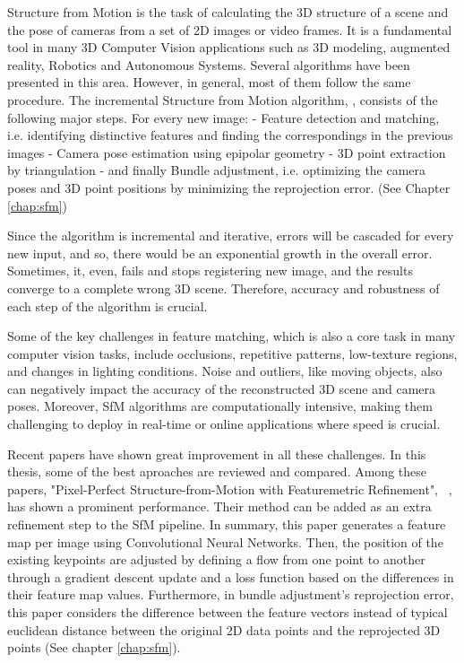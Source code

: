 \documentclass[11pt]{article}
\begin{document}
    Structure from Motion is the task of calculating the 3D structure of a scene and the pose of cameras from
    a set of 2D images or video frames.
    It is a fundamental tool in many 3D Computer Vision applications such as 3D modeling, augmented reality,
    Robotics and Autonomous Systems.
    Several algorithms have been presented in this area. However, in general, most of them follow the same procedure.
    The incremental Structure from Motion algorithm, \cite{schoenberger2016sfm}, consists of the following major steps.
    For every new image: - Feature detection and matching, i.e. identifying distinctive features and finding the
    correspondings in the previous images - Camera pose estimation using epipolar geometry - 3D point extraction
    by triangulation - and finally Bundle adjustment, i.e. optimizing the camera poses and 3D point positions by
    minimizing the reprojection error. (See Chapter \ref{chap:sfm})

    Since the algorithm is incremental and iterative, errors will be cascaded for every new input, and so, there would be
    an exponential growth in the overall error. Sometimes, it, even, fails and stops registering new image,
    and the results converge to a complete wrong 3D scene. Therefore, accuracy and robustness of each step of
    the algorithm is crucial.

    Some of the key challenges in feature matching, which is also a core task in many computer vision tasks,
    include occlusions, repetitive patterns, low-texture regions, and changes in lighting conditions.
    Noise and outliers, like moving objects, also can negatively impact the accuracy
    of the reconstructed 3D scene and camera poses. Moreover, SfM algorithms are computationally intensive,
    making them challenging to deploy in real-time or online applications where speed is crucial.

    Recent papers have shown great improvement in all these challenges. In this thesis, some of the best aproaches are
    reviewed and compared. Among these papers, "Pixel-Perfect Structure-from-Motion with Featuremetric Refinement",
    ~\cite{lindenberger2021pixsfm}, has shown a prominent performance. Their method can be added as an extra refinement
    step to the SfM pipeline. In summary, this paper generates
    a feature map per image using Convolutional Neural Networks. Then, the position of the existing keypoints are adjusted by defining a flow
    from one point to another through a gradient descent update and a loss function based on the differences in their
    feature map values.
    Furthermore, in bundle adjustment's reprojection error, this paper considers the difference between the
    feature vectors instead of typical euclidean distance between the original 2D data points and the reprojected
    3D points (See chapter \ref{chap:sfm}).
\end{document}
